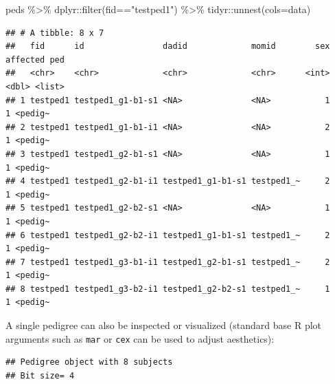 \documentclass[9pt,a4paper,]{extarticle}
\newenvironment{Shaded}{\begin{snugshade}}{\end{snugshade}}
\newcommand{\AttributeTok}[1]{\textcolor[rgb]{0.77,0.63,0.00}{#1}}
\newcommand{\DecValTok}[1]{\textcolor[rgb]{0.00,0.00,0.81}{#1}}
\newcommand{\FunctionTok}[1]{\textcolor[rgb]{0.00,0.00,0.00}{#1}}
\newcommand{\NormalTok}[1]{#1}
\newcommand{\SpecialCharTok}[1]{\textcolor[rgb]{0.00,0.00,0.00}{#1}}
\newcommand{\StringTok}[1]{\textcolor[rgb]{0.31,0.60,0.02}{#1}}
\begin{document}
\begin{Shaded}
\begin{Highlighting}[]
\NormalTok{peds }\SpecialCharTok{\%\textgreater{}\%} 
\NormalTok{  dplyr}\SpecialCharTok{::}\FunctionTok{filter}\NormalTok{(fid}\SpecialCharTok{==}\StringTok{"testped1"}\NormalTok{) }\SpecialCharTok{\%\textgreater{}\%} 
\NormalTok{  tidyr}\SpecialCharTok{::}\FunctionTok{unnest}\NormalTok{(}\AttributeTok{cols=}\NormalTok{data)}
\end{Highlighting}
\end{Shaded}

\begin{verbatim}
## # A tibble: 8 x 7
##   fid      id                dadid             momid        sex affected ped    
##   <chr>    <chr>             <chr>             <chr>      <int>    <dbl> <list> 
## 1 testped1 testped1_g1-b1-s1 <NA>              <NA>           1        1 <pedig~
## 2 testped1 testped1_g1-b1-i1 <NA>              <NA>           2        1 <pedig~
## 3 testped1 testped1_g2-b1-s1 <NA>              <NA>           1        1 <pedig~
## 4 testped1 testped1_g2-b1-i1 testped1_g1-b1-s1 testped1_~     2        1 <pedig~
## 5 testped1 testped1_g2-b2-s1 <NA>              <NA>           1        1 <pedig~
## 6 testped1 testped1_g2-b2-i1 testped1_g1-b1-s1 testped1_~     2        1 <pedig~
## 7 testped1 testped1_g3-b1-i1 testped1_g2-b1-s1 testped1_~     2        1 <pedig~
## 8 testped1 testped1_g3-b2-i1 testped1_g2-b2-s1 testped1_~     1        1 <pedig~
\end{verbatim}

A single pedigree can also be inspected or visualized (standard base R plot arguments such as \texttt{mar} or \texttt{cex} can be used to adjust aesthetics):

\begin{Shaded}
\end{Shaded}

\begin{verbatim}
## Pedigree object with 8 subjects
## Bit size= 4
\end{verbatim}

\begin{Shaded}
\end{Shaded}
\end{document}
